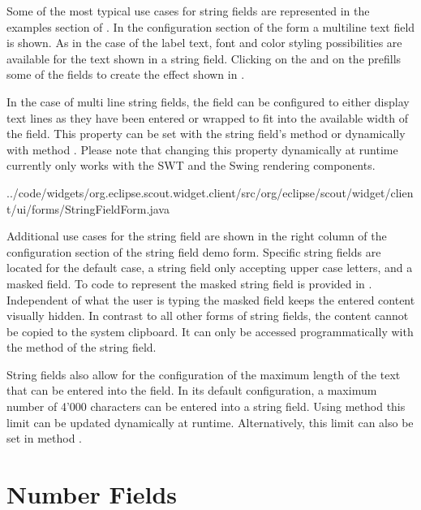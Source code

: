 \documentclass[a4paper,10pt,twoside]{book}
\begin{document}
Some of the most typical use cases for string fields are represented in the examples section of .
In the configuration section of the form a multiline text field is shown.
As in the case of the label text, font and color styling possibilities are available for the text shown in a string field. 
Clicking on the  and on the  prefills some of the fields to create the effect shown in .

In the case of multi line string fields, the field can be configured to either display text lines as they have been entered or wrapped to fit into the available width of the field. 
This property can be set with the string field's method  or dynamically with method . 
Please note that changing this property dynamically at runtime currently only works with the SWT and the Swing rendering components.


{../code/widgets/org.eclipse.scout.widget.client/src/org/eclipse/scout/widget/client/ui/forms/StringFieldForm.java}

Additional use cases for the string field are shown in the right column of the configuration section of the string field demo form. 
Specific string fields are located for the default case, a string field only accepting upper case letters, and a masked field. 
To code to represent the masked string field is provided in .
Independent of what the user is typing the masked field keeps the entered content visually hidden. 
In contrast to all other forms of string fields, the content cannot be copied to the system clipboard.
It can only be accessed programmatically with the  method of the string field.

String fields also allow for the configuration of the maximum length of the text that can be entered into the field. 
In its default configuration, a maximum number of 4'000 characters can be entered into a string field. 
Using method  this limit can be updated dynamically at runtime. 
Alternatively, this limit can also be set in method . 

\section{Number Fields}
\end{document}
